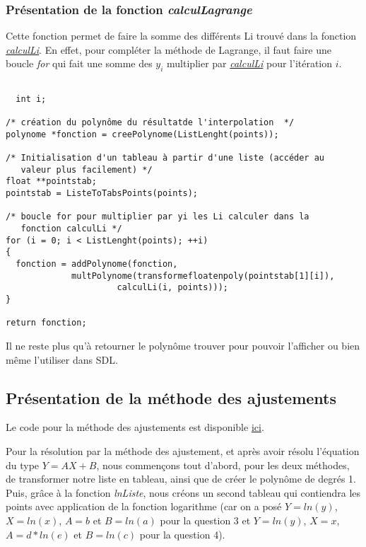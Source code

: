 \documentclass[letter]{article}
\begin{document}
\subsubsection{Présentation de la fonction \emph{calculLagrange}}
\label{sec:org08b3af0}

Cette fonction permet de faire la somme des différents Li trouvé dans la fonction \hyperref[sec:org3a52d98]{\emph{calculLi}}.
En effet, pour compléter la méthode de Lagrange, il faut faire une boucle \emph{for} qui fait une somme des \(y_i\) multiplier par \hyperref[sec:org3a52d98]{\emph{calculLi}} pour l'itération \(i\).

\begin{verbatim}

  int i;

/* création du polynôme du résultatde l'interpolation  */
polynome *fonction = creePolynome(ListLenght(points));

/* Initialisation d'un tableau à partir d'une liste (accéder au
   valeur plus facilement) */
float **pointstab;
pointstab = ListeToTabsPoints(points);

/* boucle for pour multiplier par yi les Li calculer dans la
   fonction calculLi */
for (i = 0; i < ListLenght(points); ++i)
{
  fonction = addPolynome(fonction,
			 multPolynome(transformefloatenpoly(pointstab[1][i]),
				      calculLi(i, points)));
}

return fonction;

\end{verbatim}

Il ne reste plus qu'à retourner le polynôme trouver pour pouvoir l'afficher ou bien même l'utiliser dans SDL.

\subsection{Présentation de la méthode des ajustements}
\label{sec:orgaf1f6ec}

Le code pour la méthode des ajustements est disponible \href{ajuste.c}{ici}.


Pour la résolution par la méthode des ajustement, et après avoir résolu l'équation du type \(Y = AX + B\), nous commençons tout d'abord, pour les deux méthodes, de transformer notre liste en tableau, ainsi que de créer le polynôme de degrés 1.
Puis, grâce à la fonction \emph{lnListe}, nous créons un second tableau qui contiendra les points avec application de la fonction logarithme (car on a posé \(Y = ln(y)\), \(X = ln(x)\), \(A=b\) et \(B = ln(a)\) pour la question 3 et \(Y = ln(y)\), \(X = x\), \(A=d*ln(e)\) et \(B = ln(c)\) pour la question 4). 
\end{document}
